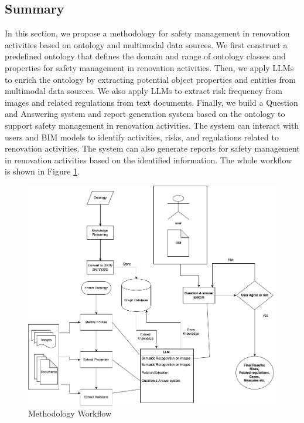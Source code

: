 \subsection{Summary}
In this section, we propose a methodology for safety management in renovation activities based on ontology and multimodal data sources.
We first construct a predefined ontology that defines the domain and range of ontology classes and properties for safety management in renovation activities.
Then, we apply LLMs to enrich the ontology by extracting potential object properties and entities from multimodal data sources.
We also apply LLMs to extract risk frequency from images and related regulations from text documents.
Finally, we build a Question and Answering system and report generation system based on the ontology to support safety management in renovation activities.
The system can interact with users and BIM models to identify activities, risks, and regulations related to renovation activities.
The system can also generate reports for safety management in renovation activities based on the identified information.
The whole workflow is shown in Figure \ref{fig:methodology_workflow}.
\begin{figure}[htbp]
    
    \label{fig:methodology_workflow}
    \centering
    \includegraphics[width=\textwidth]{figures/total workflow.png}
    \caption{Methodology Workflow}

\end{figure}